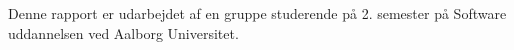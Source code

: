 Denne rapport er udarbejdet af en gruppe studerende på 2. semester på Software uddannelsen ved Aalborg Universitet.